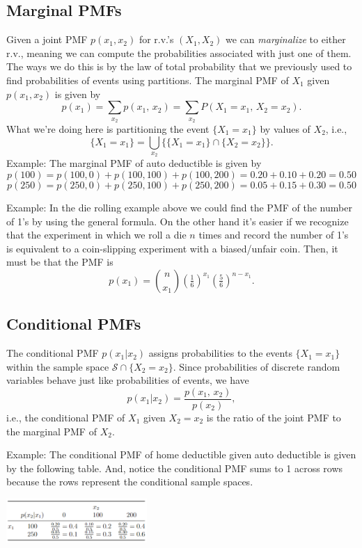 \documentclass[]{book}
\begin{document}
\subsection{Marginal PMFs}\label{marginal-pmfs}

Given a joint PMF \(p(x_1, x_2)\) for r.v.'s \((X_1, X_2)\) we can
\emph{marginalize} to either r.v., meaning we can compute the
probabilities associated with just one of them. The ways we do this is
by the law of total probability that we previously used to find
probabilities of events using partitions. The marginal PMF of \(X_1\)
given \(p(x_1, x_2)\) is given by
\[p(x_1) = \sum_{x_2} p(x_1, \, x_2) = \sum_{x_2} P(X_1 = x_1, \, X_2 = x_2).\]
What we're doing here is partitioning the event \(\{X_1 = x_1\}\) by
values of \(X_2\), i.e.,
\[\{X_1 = x_1\} = \bigcup_{x_2}\{\{X_1 = x_1\}\cap\{X_2 = x_2\}\}.\]
Example: The marginal PMF of auto deductible is given by
\[p(100) = p(100,0)+p(100,100)+p(100,200) = 0.20+0.10+0.20=0.50\]
\[p(250) = p(250,0)+p(250,100)+p(250,200) = 0.05+0.15+0.30=0.50\]

Example: In the die rolling example above we could find the PMF of the
number of 1's by using the general formula. On the other hand it's
easier if we recognize that the experiment in which we roll a die \(n\)
times and record the number of 1's is equivalent to a coin-slipping
experiment with a biased/unfair coin. Then, it must be that the PMF is
\[p(x_1) = {n \choose x_1}(\tfrac16)^{x_1}(\tfrac56)^{n-x_1}.\]

\subsection{Conditional PMFs}\label{conditional-pmfs}

The conditional PMF \(p(x_1|x_2)\) assigns probabilities to the events
\(\{X_1 = x_1\}\) within the sample space
\(\mathcal{S}\cap \{X_2 = x_2\}\). Since probabilities of discrete
random variables behave just like probabilities of events, we have
\[p(x_1|x_2) = \frac{p(x_1, \, x_2)}{p(x_2)},\] i.e., the conditional
PMF of \(X_1\) given \(X_2 = x_2\) is the ratio of the joint PMF to the
marginal PMF of \(X_2\).

Example: The conditional PMF of home deductible given auto deductible is
given by the following table. And, notice the conditional PMF sums to 1
across rows because the rows represent the conditional sample spaces.

\includegraphics[width=0.40000\textwidth]{cond_pmf.PNG}
\end{document}
